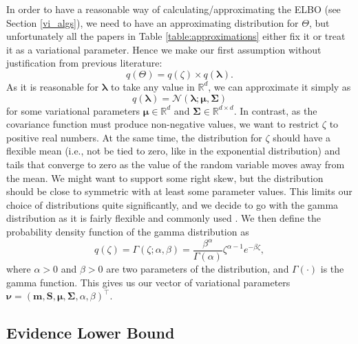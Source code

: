 \documentclass{mprop}
\theoremstyle{definition}
\begin{document}
In order to have a reasonable way of calculating/approximating the ELBO (see
Section \ref{vi_algs}), we need to have an approximating distribution for
$\Theta$, but unfortunately all the papers in Table \ref{table:approximations}
either fix it or treat it as a variational parameter. Hence we make our first
assumption without justification from previous literature:
\begin{equation} \label{eq:theta}
  q(\Theta) = q(\zeta) \times q(\bm\lambda).
\end{equation}
As it is reasonable for $\bm\lambda$ to take any value in $\mathbb{R}^d$, we can
approximate it simply as
\begin{equation} \label{eq:lambda}
  q(\bm\lambda) = \mathcal{N}(\bm\lambda; \bm\mu, \bm\Sigma)
\end{equation}
for some variational parameters $\bm\mu \in \mathbb{R}^d$ and $\bm\Sigma \in
\mathbb{R}^{d \times d}$. In contrast, as the covariance function must produce
non-negative values, we want to restrict $\zeta$ to positive real numbers. At
the same time, the distribution for $\zeta$ should have a flexible mean (i.e.,
not be tied to zero, like in the exponential distribution) and tails that
converge to zero as the value of the random variable moves away from the mean.
We might want to support some right skew, but the distribution should be close
to symmetric with at least some parameter values. This limits our choice of
distributions quite significantly, and we decide to go with the gamma
distribution as it is fairly flexible and commonly used
\cite{hogg2018introduction}. We then define the probability density function of
the gamma distribution as
\begin{equation} \label{eq:zeta}
  q(\zeta) = \Gamma(\zeta; \alpha, \beta) =
  \frac{\beta^\alpha}{\Gamma(\alpha)}\zeta^{\alpha - 1}e^{-\beta\zeta},
\end{equation}
where $\alpha > 0$ and $\beta > 0$ are two parameters of the distribution, and
$\Gamma(\cdot)$ is the gamma function. This gives us our vector of variational
parameters $\bm\nu = (\mathbf{m}, \mathbf{S}, \bm\mu, \bm\Sigma, \alpha,
\beta)^\intercal$.

\subsection{Evidence Lower Bound}
\end{document}
